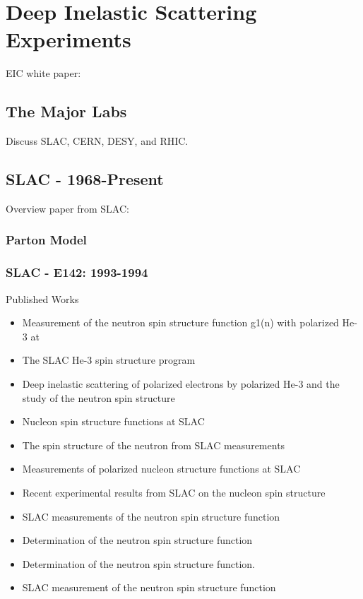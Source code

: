 \clearpage

\section{Deep Inelastic Scattering Experiments}
EIC white paper: ~\cite{Accardi2012}

\subsection{The Major Labs}

Discuss SLAC, CERN, DESY, and RHIC.

\subsection{SLAC - 1968-Present}
Overview paper from SLAC:~\cite{Riordan1992}
\subsubsection{Parton Model}
\subsubsection{SLAC - E142: 1993-1994}
Published Works
\begin{itemize}
	\item Measurement of the neutron spin structure function g1(n) with polarized He-3 at 
	\item The SLAC He-3 spin structure program 
	\item Deep inelastic scattering of polarized electrons by polarized He-3 and the study of the neutron spin structure 
	\item Nucleon spin structure functions at SLAC 
	\item The spin structure of the neutron from SLAC measurements 
	\item Measurements of polarized nucleon structure functions at SLAC 
	\item Recent experimental results from SLAC on the nucleon spin structure 
	\item SLAC measurements of the neutron spin structure function 
	\item Determination of the neutron spin structure function 
	\item	Determination of the neutron spin structure function. 
	\item	SLAC measurement of the neutron spin structure function 
\end{itemize}
